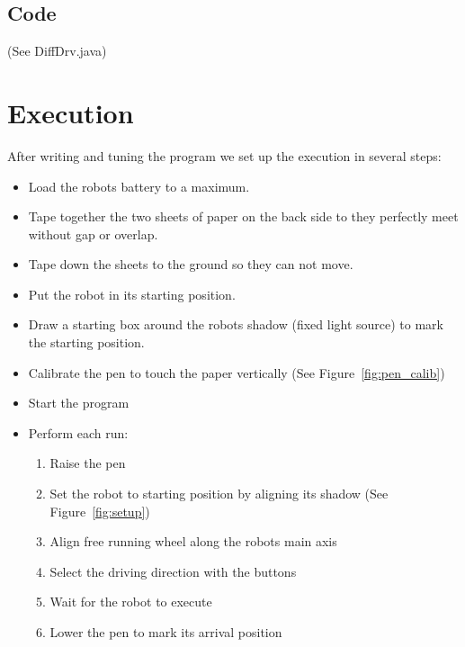 \documentclass{scrartcl}
\begin{document}
\subsection{Code}
(See DiffDrv.java)



\section{Execution}
After writing and tuning the program we set up the execution in several steps:
\begin{itemize}
\item Load the robots battery to a maximum.
\item Tape together the two sheets of paper on the back side to they perfectly meet without gap or overlap.
\item Tape down the sheets to the ground so they can not move.
\item Put the robot in its starting position.
\item Draw a starting box around the robots shadow (fixed light source) to mark the starting position.
\item Calibrate the pen to touch the paper vertically (See Figure~\ref{fig:pen_calib})
\item Start the program
\item Perform each run:
\begin{enumerate}
	\item Raise the pen
	\item Set the robot to starting position by aligning its shadow (See Figure~\ref{fig:setup})
	\item Align free running wheel along the robots main axis
	\item Select the driving direction with the buttons
	\item Wait for the robot to execute
	\item Lower the pen to mark its arrival position
\end{enumerate}

\end{itemize}
\end{document}
